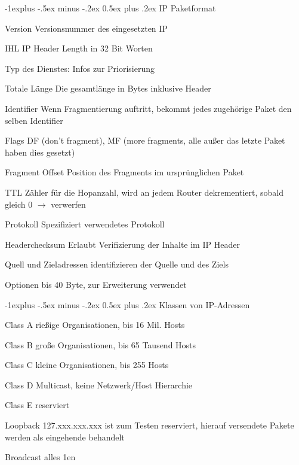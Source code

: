 \documentclass[10pt,landscape]{article}
\makeatletter
\renewcommand{\subsection}{\@startsection{subsection}{2}{0mm}%
                                {-1explus -.5ex minus -.2ex}%
                                {0.5ex plus .2ex}%
                                {\normalfont\normalsize\bfseries}}
\makeatother
\begin{document}
\begin{multicols}{3}
    \subsection{IP Paketformat}
    \begin{description*}
        \item[Version] Versionsnummer des eingesetzten IP
        \item[IHL] IP Header Length in 32 Bit Worten
        \item[Typ] des Dienstes: Infos zur Priorisierung
        \item[Totale Länge] Die gesamtlänge in Bytes inklusive Header
        \item[Identifier] Wenn Fragmentierung auftritt, bekommt jedes zugehörige Paket den selben Identifier
        \item[Flags] DF (don't fragment), MF (more fragments, alle außer das letzte Paket haben dies gesetzt)
        \item[Fragment Offset] Position des Fragments im ursprünglichen Paket
        \item[TTL] Zähler für die Hopanzahl, wird an jedem Router dekrementiert, sobald gleich 0 $\rightarrow$ verwerfen
        \item[Protokoll] Spezifiziert verwendetes Protokoll
        \item[Headerchecksum] Erlaubt Verifizierung der Inhalte im IP Header
        \item[Quell und Zieladressen] identifizieren der Quelle und des Ziels
        \item[Optionen] bis 40 Byte, zur Erweiterung verwendet
    \end{description*}
    
    \subsection{Klassen von IP-Adressen}
    \begin{description*}
        \item[Class A] rießige Organisationen, bis 16 Mil. Hosts
        \item[Class B] große Organisationen, bis 65 Tausend Hosts
        \item[Class C] kleine Organisationen, bis 255 Hosts
        \item[Class D] Multicast, keine Netzwerk/Host Hierarchie
        \item[Class E] reserviert
        \item[Loopback] 127.xxx.xxx.xxx ist zum Testen reserviert, hierauf versendete Pakete werden als eingehende behandelt
        \item[Broadcast] alles 1en
    \end{description*}
    

\end{multicols}
\end{document}
